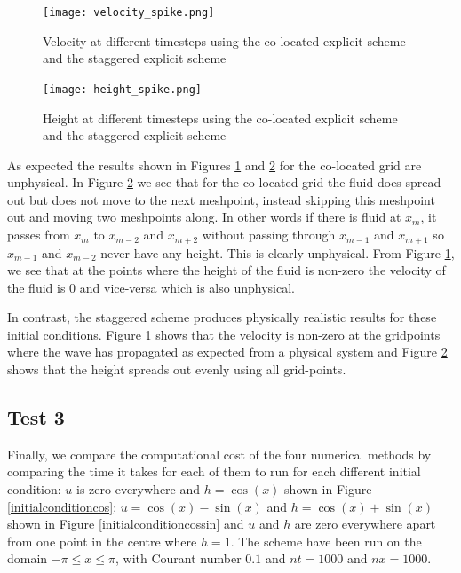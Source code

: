 \documentclass[a4paper, 10pt, notitlepage]{article}
\begin{document}
\begin{figure} [H]
	\begin{center}
	\begin{minipage}{.6\textwidth}
		\ContinuedFloat*
		\captionsetup{width=1.5\textwidth}
		\captionsetup{justification=centering}
		\texttt{[image: velocity\_spike.png]}
		\caption{\label{velocity_spike} Velocity at different timesteps using the co-located explicit scheme and the staggered explicit scheme} 
	\end{minipage}
\end{center}
\end{figure}
\begin{figure}[H]
	\begin{center}
	\begin{minipage}{.6\textwidth}
		\ContinuedFloat
		\captionsetup{width=1.5\textwidth}
		\captionsetup{justification=centering}
		\texttt{[image: height\_spike.png]}
		\caption{\label{height_spike} Height at different timesteps using the co-located explicit scheme and the staggered explicit scheme} 
	\end{minipage}
\end{center}
\end{figure}

As expected the results shown in Figures \ref{velocity_spike} and \ref{height_spike} for the co-located grid are unphysical. In Figure \ref{height_spike} we see that for the co-located grid the fluid does spread out but does not move to the next meshpoint, instead skipping this meshpoint out and moving two meshpoints along. In other words if there is fluid at $x_{m}$, it passes from $x_{m}$ to $x_{m-2}$ and $x_{m+ 2}$ without passing through $x_{m-1}$ and $x_{m+1}$ so $x_{m-1}$ and $x_{m-2}$ never have any height. This is clearly unphysical. From Figure \ref{velocity_spike}, we see that at the points where the height of the fluid is non-zero the velocity of the fluid is $0$ and vice-versa which is also unphysical. 

In contrast, the staggered scheme produces physically realistic results for these initial conditions. Figure \ref{velocity_spike} shows that the velocity is non-zero at the gridpoints where the wave has propagated as expected from a physical system and Figure \ref{height_spike} shows that the height spreads out evenly using all grid-points.


\subsection{Test 3}
Finally, we compare the computational cost of the four numerical methods by comparing the time it takes for each of them to run for each different initial condition: $u$ is zero everywhere and $h= \cos(x)$ shown in Figure \ref{initialconditioncos}; $u = \cos(x) - \sin(x)$ and $h = \cos(x) + \sin(x)$ shown in Figure \ref{initialconditioncossin} and $u$ and $h$ are zero everywhere apart from one point in the centre where $h = 1$. The scheme have been run on the domain $-\pi \leq x \leq \pi$, with Courant number $0.1$ and $nt = 1000$ and $nx = 1000$.
\end{document}
